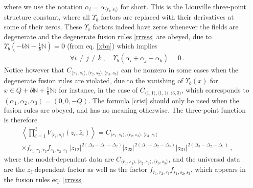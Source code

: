 \documentclass[12pt,a4paper,notitlepage]{report}
\numberwithin{equation}{section}
\theoremstyle{break}
\begin{document}
where we use the notation $\alpha_i = \alpha_{\langle r_i,s_i \rangle}$ for short.
This is the Liouville three-point structure constant, where all $\Upsilon_b$ factors are replaced with their derivatives at some of their zeros.
These $\Upsilon_b$ factors indeed have zeros whenever
the fields are degenerate and the degenerate fusion rules \eqref{rrrsss} are obeyed, due to $\Upsilon_b(-b{\mathbb{N}}-\frac{1}{b}{\mathbb{N}})=0$ (from eq. \eqref{xbn}) which implies 
\begin{align}
 \forall i\neq j\neq k\ , \quad \Upsilon_b(\alpha_i+\alpha_j-\alpha_k) = 0\ .
\end{align}
Notice however that $C_{\langle r_1,s_1\rangle ,\langle r_2,s_2\rangle ,\langle r_3,s_3 \rangle}$ can be nonzero in some cases when the degenerate fusion rules are violated, due to the vanishing of $\Upsilon_b(x)$ for $x\in Q+b{\mathbb{N}}+\frac{1}{b}{\mathbb{N}}$: for instance, in the case of $C_{\langle 1,1\rangle , \langle 1,1 \rangle,\langle 3,3 \rangle}$, which corresponds to $(\alpha_1,\alpha_2,\alpha_3)=(0,0,-Q)$.
The formula \eqref{crisi} should only be used when the fusion rules are obeyed, and has no meaning otherwise.
The three-point function is therefore 
\begin{multline}
 \left\langle \prod_{i=1}^3 V_{\langle r_i,s_i \rangle}(z_i,\bar{z}_i) \right\rangle = C_{\langle r_1,s_1\rangle ,\langle r_2,s_2\rangle ,\langle r_3,s_3 \rangle}  
\\ \times 
f_{r_1,r_2,r_3} f_{s_1,s_2,s_3}\ |z_{12}|^{2(\Delta_3-\Delta_1-\Delta_2)} |z_{23}|^{2(\Delta_1-\Delta_2-\Delta_3)} |z_{31}|^{2(\Delta_3-\Delta_2-\Delta_1)}\ ,
\end{multline}
where 
the model-dependent data are $C_{\langle r_1,s_1\rangle ,\langle r_2,s_2\rangle ,\langle r_3,s_3 \rangle}$, and the universal data are the $z_i$-dependent factor as well as the factor $f_{r_1,r_2,r_3} f_{s_1,s_2,s_3}$, which appears in the fusion rules eq. \eqref{rrrsss}. 
\end{document}
